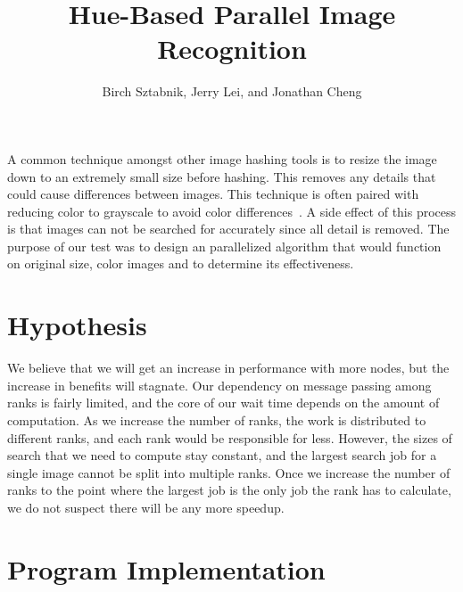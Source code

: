 \documentclass[10pt, journal]{vgtc}                %
\title{Hue-Based Parallel Image Recognition}
\author{Birch Sztabnik, Jerry Lei, and Jonathan Cheng}
\newcommand\tab[1][1cm]{\hspace*{#1}}
\begin{document}


\maketitle


\tab A common technique amongst other image hashing tools is to resize the image down to an extremely small size before hashing. This removes any details that could cause differences between images. This technique is often paired with reducing color to grayscale to avoid color differences~\cite{DBLP:conf/iih-msp/YangGN06}. A side effect of this process is that images can not be searched for accurately since all detail is removed. The purpose of our test was to design an parallelized algorithm that would function on original size, color images and to determine its effectiveness. 

\section{Hypothesis}

\tab We believe that we will get an increase in performance with more nodes, but the increase in benefits will stagnate. Our dependency on message passing among ranks is fairly limited, and the core of our wait time depends on the amount of computation. As we increase the number of ranks, the work is distributed to different ranks, and each rank would be responsible for less. However, the sizes of search that we need to compute stay constant, and the largest search job for a single image cannot be split into multiple ranks. Once we increase the number of ranks to the point where the largest job is the only job the rank has to calculate, we do not suspect there will be any more speedup. 

\section{Program Implementation}
\end{document}
